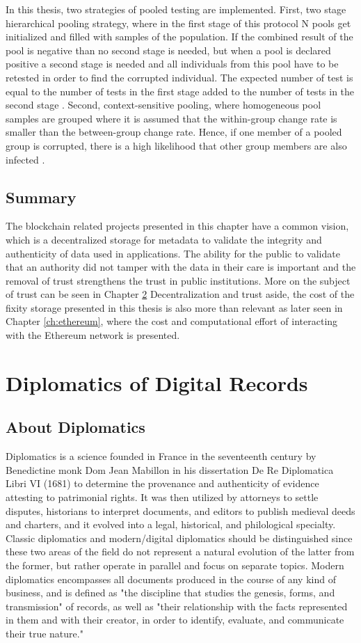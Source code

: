 \documentclass[final]{vutinfth}
\begin{document}
In this thesis, two strategies of pooled testing are implemented. 
First, two stage hierarchical pooling strategy, where in the first stage of this protocol N pools get initialized and filled with samples of the population. If the combined result of the pool is negative than no second stage is needed, but when a pool is declared positive a second stage is needed and all individuals from this pool have to be retested in order to find the corrupted individual. The expected number of test is equal to the number of tests in the first stage added to the number of tests in the second stage \cite[3]{nianogo2021optimal}.
Second, context-sensitive pooling, where homogeneous pool samples are grouped where it is assumed that the within-group change rate is smaller than the between-group change rate. Hence, if one member of a pooled group is corrupted, there is a high likelihood that other group members are also infected \cite[3]{deckert2020simulation}.

\section{Summary}
The blockchain related projects presented in this chapter have a common vision, which is a decentralized storage for metadata to validate the integrity and authenticity of data used in applications. The ability for the public to validate that an authority did not tamper with the data in their care is important and the removal of trust strengthens the trust in public institutions. More on the subject of trust can be seen in Chapter \ref{ch:diplomatics}
Decentralization and trust aside, the cost of the fixity storage presented in this thesis is also more than relevant as later seen in Chapter \ref{ch:ethereum}, where the cost and computational effort of interacting with the Ethereum network is presented.
 \chapter{Diplomatics of Digital Records}
\label{ch:diplomatics}
\section{About Diplomatics}
Diplomatics is a science founded in France in the seventeenth century by Benedictine monk Dom Jean Mabillon in his dissertation De Re Diplomatica Libri VI (1681) to determine the provenance and authenticity of evidence attesting to patrimonial rights. It was then utilized by attorneys to settle disputes, historians to interpret documents, and editors to publish medieval deeds and charters, and it evolved into a legal, historical, and philological specialty.
Classic diplomatics and modern/digital diplomatics should be distinguished since these two areas of the field do not represent a natural evolution of the latter from the former, but rather operate in parallel and focus on separate topics. Modern diplomatics encompasses all documents produced in the course of any kind of business, and is defined as "the discipline that studies the genesis, forms, and transmission" of records, as well as "their relationship with the facts represented in them and with their creator, in order to identify, evaluate, and communicate their true nature."
\end{document}
